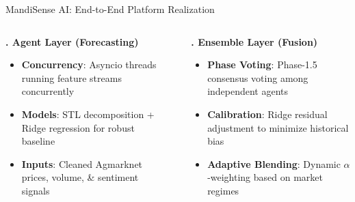 \documentclass{beamer}
\begin{document}
\begin{frame}{MandiSense AI: End-to-End Platform Realization}
\begin{columns}[T]
    \begin{smallcard}[0.98\textwidth, top=1.5pt, bottom=1.5pt, left=4pt, right=4pt, boxsep=0.5pt]
        \textbf{\textcolor{primaryDark}{\fontsize{6.5pt}{7.5pt}. Agent Layer (Forecasting)}}
        \vspace{0.02cm}
        \begin{itemize}\setlength\itemsep{0.5pt}\setlength\parskip{0pt}
            \tiny
            \item \textbf{Concurrency}: Asyncio threads running feature streams concurrently
            \item \textbf{Models}: STL decomposition + Ridge regression for robust baseline
            \item \textbf{Inputs}: Cleaned Agmarknet prices, volume, \& sentiment signals
        \end{itemize}
    \end{smallcard}
    
    \vspace{-0.02cm}
    {\centering\textcolor{primaryLight}{\fontsize{5pt}{6pt}\selectfont {}}\par}
    \vspace{-0.02cm}
    
    \begin{smallcard}[0.98\textwidth, top=1.5pt, bottom=1.5pt, left=4pt, right=4pt, boxsep=0.5pt]
        \textbf{\textcolor{primaryDark}{\fontsize{6.5pt}{7.5pt}. Ensemble Layer (Fusion)}}
        \vspace{0.02cm}
        \begin{itemize}\setlength\itemsep{0.5pt}\setlength\parskip{0pt}
            \tiny
            \item \textbf{Phase Voting}: Phase-1.5 consensus voting among independent agents
            \item \textbf{Calibration}: Ridge residual adjustment to minimize historical bias
            \item \textbf{Adaptive Blending}: Dynamic $\alpha$-weighting based on market regimes
        \end{itemize}
    \end{smallcard}

    

\end{columns}
\end{frame}
\end{document}
